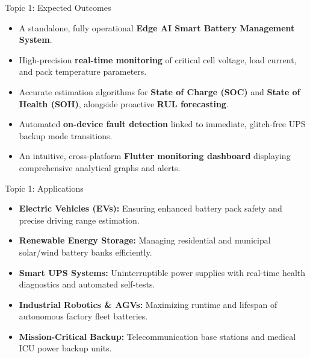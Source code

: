 \documentclass{beamer}
\begin{document}
\begin{frame}{Topic 1: Expected Outcomes}
\begin{itemize}
  \item A standalone, fully operational \textbf{Edge AI Smart Battery Management System}.
  \vspace{0.25cm}
  \item High-precision \textbf{real-time monitoring} of critical cell voltage, load current, and pack temperature parameters.
  \vspace{0.25cm}
  \item Accurate estimation algorithms for \textbf{State of Charge (SOC)} and \textbf{State of Health (SOH)}, alongside proactive \textbf{RUL forecasting}.
  \vspace{0.25cm}
  \item Automated \textbf{on-device fault detection} linked to immediate, glitch-free UPS backup mode transitions.
  \vspace{0.25cm}
  \item An intuitive, cross-platform \textbf{Flutter monitoring dashboard} displaying comprehensive analytical graphs and alerts.
\end{itemize}
\end{frame}

\begin{frame}{Topic 1: Applications}
\begin{itemize}
  \item \textbf{Electric Vehicles (EVs):} Ensuring enhanced battery pack safety and precise driving range estimation.
  \vspace{0.25cm}
  \item \textbf{Renewable Energy Storage:} Managing residential and municipal solar/wind battery banks efficiently.
  \vspace{0.25cm}
  \item \textbf{Smart UPS Systems:} Uninterruptible power supplies with real-time health diagnostics and automated self-tests.
  \vspace{0.25cm}
  \item \textbf{Industrial Robotics \& AGVs:} Maximizing runtime and lifespan of autonomous factory fleet batteries.
  \vspace{0.25cm}
  \item \textbf{Mission-Critical Backup:} Telecommunication base stations and medical ICU power backup units.
\end{itemize}
\end{frame}
\end{document}
